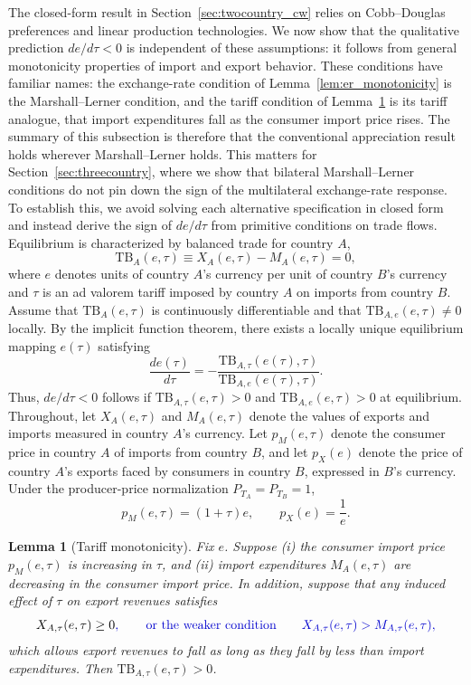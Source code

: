 \documentclass[11pt]{article}
\theoremstyle{plain}
\newtheorem{lemma}{Lemma}
\theoremstyle{remark}
\numberwithin{lemma}{section}
\numberwithin{proposition}{section}
\numberwithin{corollary}{section}
\newcommand{\rev}[1]{{\color{RevBlue}#1}}
\begin{document}
The closed-form result in \rev{Section~\ref{sec:twocountry_cw}} relies on Cobb--Douglas preferences and linear production technologies. We now show that the qualitative prediction $de/d\tau < 0$ is independent of these assumptions: it follows from general monotonicity properties of import and export behavior\rev{. These conditions have familiar names: the exchange-rate condition of Lemma~\ref{lem:er_monotonicity} is the Marshall--Lerner condition, and the tariff condition of Lemma~\ref{lem:tariff_monotonicity} is its tariff analogue, that import expenditures fall as the consumer import price rises. The summary of this subsection is therefore that the conventional appreciation result holds wherever Marshall--Lerner holds. This matters for Section~\ref{sec:threecountry}, where we show that bilateral Marshall--Lerner conditions do not pin down the sign of the multilateral exchange-rate response.} To establish this, we avoid solving each alternative specification in closed form and instead derive the sign of $de/d\tau$ from primitive conditions on trade flows. Equilibrium is characterized by balanced trade for country $A$,
\[
\mathrm{TB}_A(e,\tau) \equiv X_A(e,\tau) - M_A(e,\tau) = 0,
\]
where $e$ denotes units of country $A$'s currency per unit of country $B$'s currency and $\tau$ is an ad valorem tariff imposed by country $A$ on imports from country $B$. Assume that $\mathrm{TB}_A(e,\tau)$ is continuously differentiable and that $\mathrm{TB}_{A,e}(e,\tau) \neq 0$ locally. By the implicit function theorem, there exists a locally unique equilibrium mapping $e(\tau)$ satisfying
\[
\frac{de(\tau)}{d\tau} = -\frac{\mathrm{TB}_{A,\tau}(e(\tau),\tau)}{\mathrm{TB}_{A,e}(e(\tau),\tau)}.
\]
Thus, $de/d\tau < 0$ follows if $\mathrm{TB}_{A,\tau}(e,\tau) > 0$ and $\mathrm{TB}_{A,e}(e,\tau) > 0$ at equilibrium. Throughout, let $X_A(e,\tau)$ and $M_A(e,\tau)$ denote the values of exports and imports measured in country $A$'s currency. Let $p_M(e,\tau)$ denote the consumer price in country $A$ of imports from country $B$, and let $p_X(e)$ denote the price of country $A$'s exports faced by consumers in country $B$, expressed in $B$'s currency. Under the producer-price normalization $P_{T_A} = P_{T_B} = 1$,
\[
p_M(e,\tau) = (1+\tau)e, \qquad p_X(e) = \frac{1}{e}.
\]

\begin{lemma}[Tariff monotonicity]\label{lem:tariff_monotonicity}
Fix $e$. Suppose (i) the consumer import price $p_M(e,\tau)$ is increasing in $\tau$, and (ii) import expenditures $M_A(e,\tau)$ are decreasing in the consumer import price. In addition, suppose that any induced effect of $\tau$ on export revenues satisfies
\[
X_{A,\tau}(e,\tau) \ge 0\rev{, \qquad \text{or the weaker condition} \qquad X_{A,\tau}(e,\tau) > M_{A,\tau}(e,\tau),}
\]
\rev{which allows export revenues to fall as long as they fall by less than import expenditures.} Then $\mathrm{TB}_{A,\tau}(e,\tau) > 0$.
\end{lemma}
\end{document}
